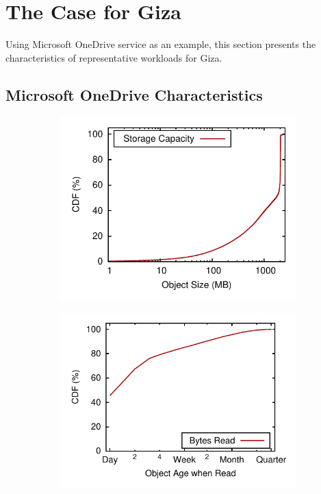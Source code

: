 \section{The Case for Giza}
\label{sec:motivation}

Using Microsoft OneDrive service as an example, this section presents the characteristics of representative workloads for Giza.

\subsection{Microsoft OneDrive Characteristics}

\begin{figure}[tp]
\hspace{-3em}
\begin{subfigure}{.3\textwidth}
  \centering
  \includegraphics[width=\linewidth]{data/object_size-storage_capacity}
  \caption{}
  \label{fig:object_size-storage_capacity}
\end{subfigure}%
\begin{subfigure}{.3\textwidth}
  \centering
  \includegraphics[width=\linewidth]{data/write_read_gap-bytes_read}

\end{subfigure}
\end{figure}
